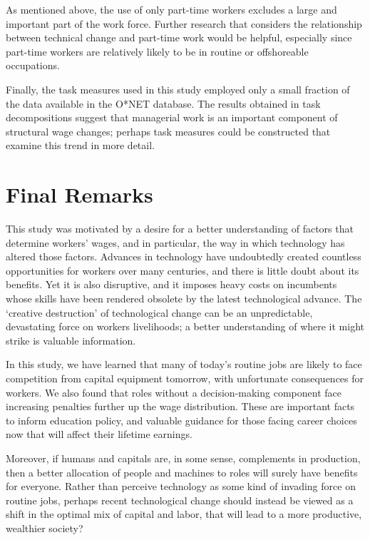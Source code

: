 As mentioned above, the use of only part-time workers excludes a large and important part of the work force. Further research that considers the relationship between technical change and part-time work would be helpful, especially since part-time workers are relatively likely to be in routine or offshoreable occupations.

Finally, the task measures used in this study employed only a small fraction of the data available in the O*NET database. The results obtained in task decompositions suggest that managerial work is an important component of structural wage changes; perhaps task measures could be constructed that examine this trend in more detail.

\section{Final Remarks}

This study was motivated by a desire for a better understanding of factors that determine workers' wages, and in particular, the way in which technology has altered those factors. Advances in technology have undoubtedly created countless opportunities for workers over many centuries, and there is little doubt about its benefits. Yet it is also disruptive, and it imposes heavy costs on incumbents whose skills have been rendered obsolete by the latest technological advance. The `creative destruction' of technological change can be an unpredictable, devastating force on workers livelihoods;  a better understanding of where it might strike is valuable information.

In this study, we have learned that many of today's routine jobs are likely to face competition from capital equipment tomorrow, with unfortunate consequences for workers. We also found that roles without a decision-making component face increasing penalties further up the wage distribution. These are important facts to inform education policy, and valuable guidance for those facing career choices now that will affect their lifetime earnings. 

Moreover, if humans and capitals are, in some sense, complements in production, then a better allocation of people and machines to roles will surely have benefits for everyone. Rather than perceive technology as some kind of invading force on routine jobs, perhaps recent technological change should instead be viewed as a shift in the optimal mix of capital and labor, that will lead to a more productive, wealthier society?

